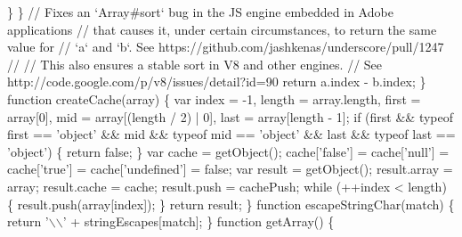 \begin{DoxyCodeInclude}
\textcolor{stringliteral}{      \}}
\textcolor{stringliteral}{    \}}
\textcolor{stringliteral}{    // Fixes an `Array#sort` bug in the JS engine embedded in Adobe applications}
\textcolor{stringliteral}{    // that causes it, under certain circumstances, to return the same value for}
\textcolor{stringliteral}{    // `a` and `b`. See https://github.com/jashkenas/underscore/pull/1247}
\textcolor{stringliteral}{    //}
\textcolor{stringliteral}{    // This also ensures a stable sort in V8 and other engines.}
\textcolor{stringliteral}{    // See http://code.google.com/p/v8/issues/detail?id=90}
\textcolor{stringliteral}{    return a.index - b.index;}
\textcolor{stringliteral}{  \}}
\textcolor{stringliteral}{}
\textcolor{stringliteral}{  function createCache(array) \{}
\textcolor{stringliteral}{    var index = -1,}
\textcolor{stringliteral}{        length = array.length,}
\textcolor{stringliteral}{        first = array[0],}
\textcolor{stringliteral}{        mid = array[(length / 2) | 0],}
\textcolor{stringliteral}{        last = array[length - 1];}
\textcolor{stringliteral}{}
\textcolor{stringliteral}{    if (first && typeof first == '}\textcolor{keywordtype}{object}\textcolor{stringliteral}{' &&}
\textcolor{stringliteral}{        mid && typeof mid == '}\textcolor{keywordtype}{object}\textcolor{stringliteral}{' && last && typeof last == '}\textcolor{keywordtype}{object}\textcolor{stringliteral}{') \{}
\textcolor{stringliteral}{      return false;}
\textcolor{stringliteral}{    \}}
\textcolor{stringliteral}{    var cache = getObject();}
\textcolor{stringliteral}{    cache['}\textcolor{keyword}{false}\textcolor{stringliteral}{'] = cache['}null\textcolor{stringliteral}{'] = cache['}\textcolor{keyword}{true}\textcolor{stringliteral}{'] = cache['}undefined\textcolor{stringliteral}{'] = false;}
\textcolor{stringliteral}{}
\textcolor{stringliteral}{    var result = getObject();}
\textcolor{stringliteral}{    result.array = array;}
\textcolor{stringliteral}{    result.cache = cache;}
\textcolor{stringliteral}{    result.push = cachePush;}
\textcolor{stringliteral}{}
\textcolor{stringliteral}{    while (++index < length) \{}
\textcolor{stringliteral}{      result.push(array[index]);}
\textcolor{stringliteral}{    \}}
\textcolor{stringliteral}{    return result;}
\textcolor{stringliteral}{  \}}
\textcolor{stringliteral}{}
\textcolor{stringliteral}{  function escapeStringChar(match) \{}
\textcolor{stringliteral}{    return '}\(\backslash\)\(\backslash\)\textcolor{stringliteral}{' + stringEscapes[match];}
\textcolor{stringliteral}{  \}}
\textcolor{stringliteral}{}
\textcolor{stringliteral}{  function getArray() \{}

\end{DoxyCodeInclude}
